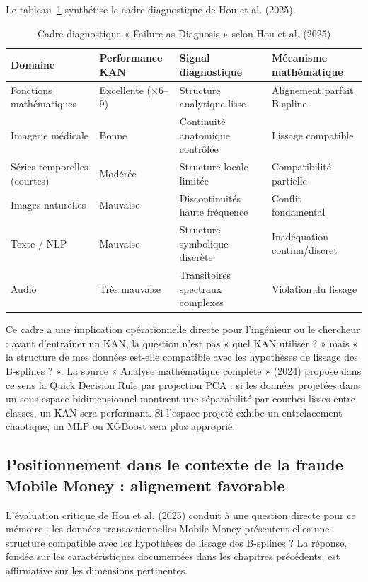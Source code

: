 \documentclass[11pt,a4paper,oneside]{report}
\theoremstyle{definition}
\theoremstyle{remark}
\begin{document}
Le tableau~\ref{tab:failure-diagnosis} synthétise le cadre diagnostique de Hou et al. (2025).

\begin{table}[H]
\centering
\caption{Cadre diagnostique « Failure as Diagnosis » selon Hou et al. (2025)}
\label{tab:failure-diagnosis}
\small
\begin{tabular}{p{2.6cm}p{2.2cm}p{3.6cm}p{3.6cm}}
\toprule
\textbf{Domaine} & \textbf{Performance KAN} & \textbf{Signal diagnostique} & \textbf{Mécanisme mathématique} \\
\midrule
Fonctions mathématiques & Excellente ($\times 6$--$9$) & Structure analytique lisse & Alignement parfait B-spline \\
\addlinespace
Imagerie médicale & Bonne & Continuité anatomique contrôlée & Lissage compatible \\
\addlinespace
Séries temporelles (courtes) & Modérée & Structure locale limitée & Compatibilité partielle \\
\addlinespace
Images naturelles & Mauvaise & Discontinuités haute fréquence & Conflit fondamental \\
\addlinespace
Texte / NLP & Mauvaise & Structure symbolique discrète & Inadéquation continu/discret \\
\addlinespace
Audio & Très mauvaise & Transitoires spectraux complexes & Violation du lissage \\
\bottomrule
\end{tabular}
\end{table}

Ce cadre a une implication opérationnelle directe pour l'ingénieur ou le chercheur : avant d'entraîner un KAN, la question n'est pas « quel KAN utiliser ? » mais « la structure de mes données est-elle compatible avec les hypothèses de lissage des B-splines ? ». La source « Analyse mathématique complète » (2024) propose dans ce sens la Quick Decision Rule par projection PCA : si les données projetées dans un sous-espace bidimensionnel montrent une séparabilité par courbes lisses entre classes, un KAN sera performant. Si l'espace projeté exhibe un entrelacement chaotique, un MLP ou XGBoost sera plus approprié.

\subsection{Positionnement dans le contexte de la fraude Mobile Money : alignement favorable}

L'évaluation critique de Hou et al. (2025) conduit à une question directe pour ce mémoire : les données transactionnelles Mobile Money présentent-elles une structure compatible avec les hypothèses de lissage des B-splines ? La réponse, fondée sur les caractéristiques documentées dans les chapitres précédents, est affirmative sur les dimensions pertinentes.
\end{document}
